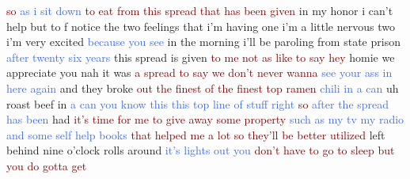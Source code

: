 \textcolor{Maroon}{so} \textcolor{RoyalBlue}{as} \textcolor{RoyalBlue}{i} \textcolor{RoyalBlue}{sit} \textcolor{RoyalBlue}{down} \textcolor{Maroon}{to} \textcolor{Maroon}{eat} \textcolor{Maroon}{from} \textcolor{Maroon}{this} \textcolor{Maroon}{spread} \textcolor{Maroon}{that} \textcolor{Maroon}{has} \textcolor{Maroon}{been} \textcolor{Maroon}{given} in my honor i can't help but to f notice the two feelings that i'm having one i'm a little nervous two i'm very excited \textcolor{RoyalBlue}{because} \textcolor{RoyalBlue}{you} \textcolor{RoyalBlue}{see} in the morning i'll be paroling from state prison \textcolor{RoyalBlue}{after} \textcolor{RoyalBlue}{twenty} \textcolor{RoyalBlue}{six} \textcolor{RoyalBlue}{years} this spread is given \textcolor{Maroon}{to} \textcolor{Maroon}{me} \textcolor{Maroon}{not} \textcolor{Maroon}{as} \textcolor{Maroon}{like} \textcolor{Maroon}{to} \textcolor{Maroon}{say} \textcolor{Maroon}{hey} homie we appreciate you nah it was \textcolor{Maroon}{a} \textcolor{Maroon}{spread} \textcolor{Maroon}{to} \textcolor{Maroon}{say} \textcolor{Maroon}{we} \textcolor{Maroon}{don't} \textcolor{Maroon}{never} \textcolor{Maroon}{wanna} \textcolor{RoyalBlue}{see} \textcolor{RoyalBlue}{your} \textcolor{RoyalBlue}{ass} \textcolor{RoyalBlue}{in} \textcolor{RoyalBlue}{here} \textcolor{RoyalBlue}{again} and they broke \textcolor{Maroon}{out} \textcolor{Maroon}{the} \textcolor{Maroon}{finest} \textcolor{Maroon}{of} \textcolor{Maroon}{the} \textcolor{Maroon}{finest} \textcolor{Maroon}{top} \textcolor{Maroon}{ramen} \textcolor{RoyalBlue}{chili} \textcolor{RoyalBlue}{in} \textcolor{RoyalBlue}{a} \textcolor{RoyalBlue}{can} uh roast beef in \textcolor{RoyalBlue}{a} \textcolor{RoyalBlue}{can} \textcolor{RoyalBlue}{you} \textcolor{RoyalBlue}{know} \textcolor{RoyalBlue}{this} \textcolor{RoyalBlue}{this} \textcolor{RoyalBlue}{top} \textcolor{RoyalBlue}{line} \textcolor{RoyalBlue}{of} \textcolor{RoyalBlue}{stuff} \textcolor{RoyalBlue}{right} \textcolor{Maroon}{so} \textcolor{RoyalBlue}{after} \textcolor{RoyalBlue}{the} \textcolor{RoyalBlue}{spread} \textcolor{RoyalBlue}{has} \textcolor{RoyalBlue}{been} had \textcolor{Maroon}{it's} \textcolor{Maroon}{time} \textcolor{Maroon}{for} \textcolor{Maroon}{me} \textcolor{Maroon}{to} \textcolor{Maroon}{give} \textcolor{Maroon}{away} \textcolor{Maroon}{some} \textcolor{Maroon}{property} \textcolor{RoyalBlue}{such} \textcolor{RoyalBlue}{as} \textcolor{RoyalBlue}{my} \textcolor{RoyalBlue}{tv} \textcolor{RoyalBlue}{my} \textcolor{RoyalBlue}{radio} \textcolor{RoyalBlue}{and} \textcolor{RoyalBlue}{some} \textcolor{RoyalBlue}{self} \textcolor{RoyalBlue}{help} \textcolor{RoyalBlue}{books} \textcolor{Maroon}{that} \textcolor{Maroon}{helped} \textcolor{Maroon}{me} \textcolor{Maroon}{a} \textcolor{Maroon}{lot} \textcolor{Maroon}{so} \textcolor{Maroon}{they'll} \textcolor{Maroon}{be} \textcolor{Maroon}{better} \textcolor{Maroon}{utilized} left behind nine o'clock rolls around \textcolor{RoyalBlue}{it's} \textcolor{RoyalBlue}{lights} \textcolor{RoyalBlue}{out} \textcolor{RoyalBlue}{you} \textcolor{Maroon}{don't} \textcolor{Maroon}{have} \textcolor{Maroon}{to} \textcolor{Maroon}{go} \textcolor{Maroon}{to} \textcolor{Maroon}{sleep} \textcolor{Maroon}{but} \textcolor{Maroon}{you} \textcolor{Maroon}{do} \textcolor{Maroon}{gotta} \textcolor{Maroon}{get} 